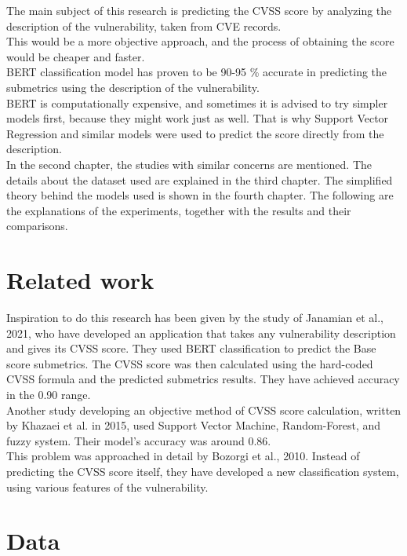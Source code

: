 \documentclass[times, utf8, zavrsni, english]{fer}
\begin{document}
The main subject of this research is predicting the CVSS score by analyzing the description of the vulnerability, taken from CVE records. \\
This would be a more objective approach, and the process of obtaining the score would be cheaper and faster. \\
BERT classification model has proven to be 90-95 \% accurate in predicting the submetrics using the description of the vulnerability. \\
BERT is computationally expensive, and sometimes it is advised to try simpler models first, because they might work just as well. That is why Support Vector Regression and similar models were used to predict the score directly from the description.\\

In the second chapter, the studies with similar concerns are mentioned. The details about the dataset used are explained in the third chapter. The simplified theory behind the models used is shown in the fourth chapter. The following are the explanations of the experiments, together with the results and their comparisons. 

\chapter{Related work}
Inspiration to do this research has been given by the study of Janamian et al., 2021, who have developed an application that takes any vulnerability description and gives its CVSS score. They used BERT classification to predict the Base score submetrics. The CVSS score was then calculated using the hard-coded CVSS formula and the predicted submetrics results. They have achieved accuracy in the 0.90 range. \\

Another study developing an objective method of CVSS score calculation, written by Khazaei et al. in 2015, used Support Vector Machine, Random-Forest, and fuzzy system. Their model's accuracy was around 0.86. \\

This problem was approached in detail by Bozorgi et al., 2010.  Instead of predicting the CVSS score itself, they have developed a new classification system, using various features of the vulnerability. \\

\chapter{Data}
\end{document}
